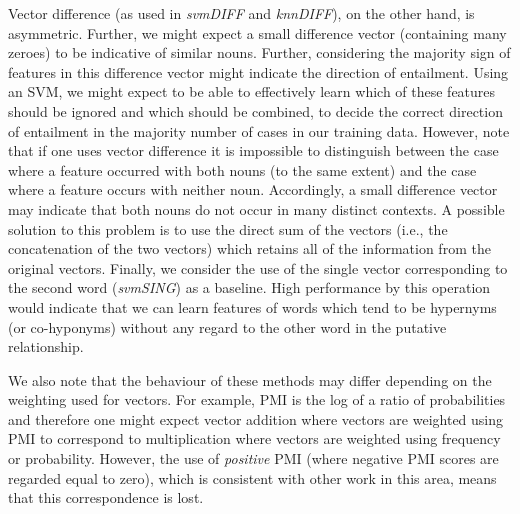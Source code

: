 \documentclass[11pt]{article}
\begin{document}
Vector difference (as used in \emph{svmDIFF} and \emph{knnDIFF}), on the other hand, is asymmetric.  Further, we might expect a small difference vector (containing many zeroes) to be indicative of similar nouns.   Further, considering the majority sign of features in this difference vector might indicate the direction of entailment. Using an SVM, we might expect to be able to effectively learn which of these features should be ignored and which should be combined, to decide the correct direction of entailment in the majority number of cases in our training data.   However, note that if one uses vector difference it is impossible to distinguish between the case where a feature occurred with both nouns (to the same extent) and the case where a feature occurs with neither noun.  Accordingly, a small difference vector may indicate that both nouns do not occur in many distinct contexts.  A possible solution to this problem is to use the direct sum of the vectors (i.e., the concatenation of the two vectors) which retains all of the information from the original vectors.   Finally, we consider the use of the single vector corresponding to the second word (\emph{svmSING}) as a baseline.  High performance by this operation would indicate that we can learn features of words which tend to be hypernyms (or co-hyponyms) without any regard to the other word in the putative relationship.

We also note that the behaviour of these methods may differ
depending on the weighting used for vectors.  For example, PMI is the log of a ratio of probabilities and therefore one might expect vector addition where vectors are weighted using PMI to correspond to multiplication where vectors are weighted using frequency or probability.  However, the use of \emph{positive} PMI (where negative PMI scores are regarded equal to zero), which is consistent with other work in this area, means that this correspondence is lost.



\end{document}
